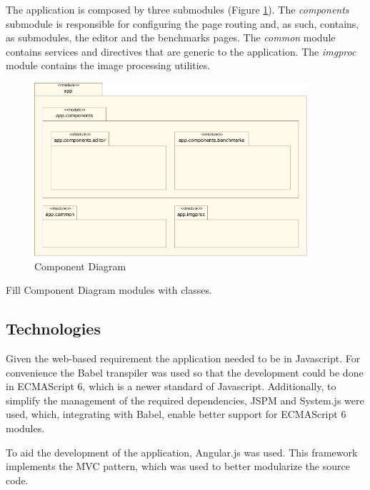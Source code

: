     The application is composed by three submodules (Figure \ref{fig:component_diagram}). The \textit{components} submodule is responsible for configuring the page routing and, as such, contains, as submodules, the editor and the benchmarks pages. The \textit{common} module contains services and directives that are generic to the application. The \textit{imgproc} module contains the image processing utilities.
    
    \begin{figure}[H]
      \begin{center}
      	 \includegraphics[width=0.9\textwidth]{images/diagrams/component.pdf}
      \end{center}
      \caption{Component Diagram}
      \label{fig:component_diagram}
    \end{figure}
    
    \begin{notes}
    	\item Fill Component Diagram modules with classes.
    \end{notes}

    \subsection {Technologies}    
      
      Given the web-based requirement the application needed to be in Javascript. For convenience the Babel transpiler was used so that the development could be done in ECMAScript 6, which is a newer standard of Javascript. Additionally, to simplify the management of the required dependencies, JSPM and System.js were used, which, integrating with Babel, enable better support for ECMAScript 6 modules. 
      
      To aid the development of the application, Angular.js was used. This framework implements the MVC pattern, which was used to better modularize the source code.
      

